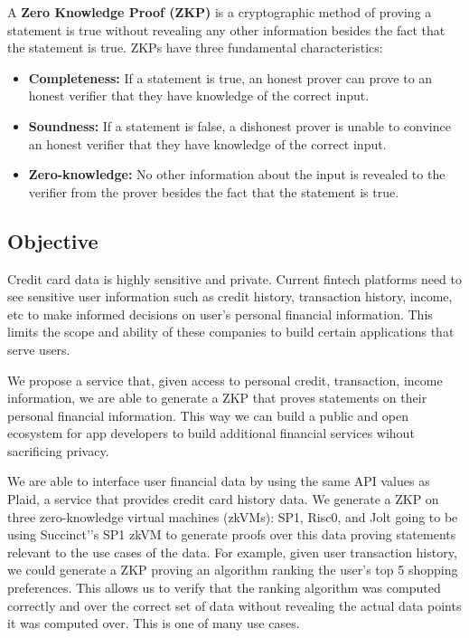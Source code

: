 \documentclass{scrartcl}
\begin{document}
A \textbf{Zero Knowledge Proof (ZKP)} is a cryptographic method of proving a statement is true without revealing any other information besides the fact that the statement is true. ZKPs have three fundamental characteristics:

\begin{itemize}
    \item \textbf{Completeness:} If a statement is true, an honest prover can prove to an honest verifier that they have knowledge of the correct input.
    \item \textbf{Soundness:} If a statement is false, a dishonest prover is unable to convince an honest verifier that they have knowledge of the correct input.
    \item \textbf{Zero-knowledge:} No other information about the input is revealed to the verifier from the prover besides the fact that the statement is true.
\end{itemize}


\subsection{Objective}

Credit card data is highly sensitive and private. Current fintech platforms need to see sensitive user information such as credit history, transaction history, income, etc to make informed decisions on user’s personal financial information. This limits the scope and ability of these companies to build certain applications that serve users.

We propose a service that, given access to personal credit, transaction, income information, we are able to generate a ZKP\cite{Groth2016} that proves statements on their personal financial information. This way we can build a public and open ecosystem for app developers to build additional financial services wihout sacrificing privacy.

We are able to interface user financial data by using the same API values as Plaid, a service that provides credit card history data. We generate a ZKP on three zero-knowledge virtual machines (zkVMs): SP1\cite{Roy2024}, Risc0\cite{bruestle2023risc}, and Jolt\cite{arun2024jolt} going to be using Succinct’'s SP1 zkVM\cite{Roy2024} to generate proofs over this data proving statements relevant to the use cases of the data. For example, given user transaction history, we could generate a ZKP proving an algorithm ranking the user’s top 5 shopping preferences. This allows us to verify that the ranking algorithm was computed correctly and over the correct set of data without revealing the actual data points it was computed over. This is one of many use cases.
\end{document}
